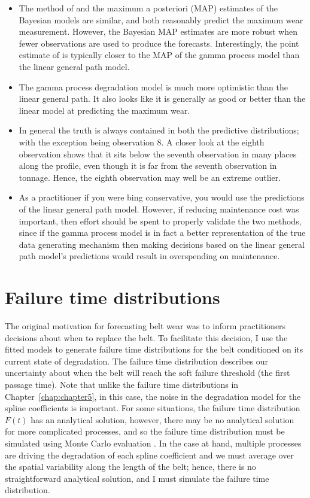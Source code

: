 \begin{itemize}
  \item The method of \citet{webb_2020} and the maximum a posteriori (MAP) estimates of the Bayesian models are similar, and both reasonably predict the maximum wear measurement. However, the Bayesian MAP estimates are more robust when fewer observations are used to produce the forecasts. Interestingly, the point estimate of \citet{webb_2020} is typically closer to the MAP of the gamma process model than the linear general path model.
  \item The gamma process degradation model is much more optimistic than the linear general path. It also looks like it is generally as good or better than the linear model at predicting the maximum wear.
  \item In general the truth is always contained in both the predictive distributions; with the exception being observation $8$. A closer look at the eighth observation shows that it sits below the seventh observation in many places along the profile, even though it is far from the seventh observation in tonnage. Hence, the eighth observation may well be an extreme outlier.
  \item As a practitioner if you were bing conservative, you would use the predictions of the linear general path model. However, if reducing maintenance cost was important, then effort should be spent to properly validate the two methods, since if the gamma process model is in fact a better representation of the true data generating mechanism then making decisions based on the linear general path model's predictions would result in overspending on maintenance.
\end{itemize}

\section{Failure time distributions}

The original motivation for forecasting belt wear was to inform practitioners decisions about when to replace the belt. To facilitate this decision, I use the fitted models to generate failure time distributions for the belt conditioned on its current state of degradation. The failure time distribution describes our uncertainty about when the belt will reach the soft failure threshold (the first passage time). Note that unlike the failure time distributions in Chapter~\ref{chap:chapter5}, in this case, the noise in the degradation model for the spline coefficients is important. For some situations, the failure time distribution $F(t)$ has an analytical solution, however, there may be no analytical solution for more complicated processes, and so the failure time distribution must be simulated using Monte Carlo evaluation \citep[p.~504-506]{Meeker2022}. In the case at hand, multiple processes are driving the degradation of each spline coefficient and we must average over the spatial variability along the length of the belt; hence, there is no straightforward analytical solution, and I must simulate the failure time distribution.

